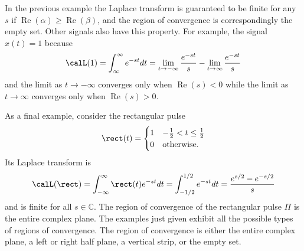 \documentclass[11pt,a4paper]{book}
\theoremstyle{plain}
\numberwithin{equation}{section}
\newcommand{\complex}{{\mathbb C}}
\renewcommand{\Re}{\operatorname{Re}}
\begin{document}
In the previous example the Laplace transform is guaranteed to be finite for any $s$ if $\Re(\alpha) \geq \Re(\beta)$, and the region of convergence is correspondingly the empty set.  Other signals also have this property.  For example, the signal $x(t) = 1$ because
\[
\calL(1) = \int_{\infty}^\infty e^{-s t} dt = \lim_{t\to -\infty} \frac{e^{-st}}{s} -  \lim_{t\to \infty} \frac{e^{-st}}{s}
\] 
and the limit as $t\to-\infty$ converges only when $\Re(s) < 0$ while the limit as $t \to \infty$ converges only when $\Re(s) > 0$.  %

As a final example, consider the rectangular pulse
\[
\rect(t) = \begin{cases}
1 & -\tfrac{1}{2} < t \leq \tfrac{1}{2} \\
0 & \text{otherwise}.
\end{cases}
\]
Its Laplace transform is
\begin{equation}\label{eq:rectLaplace}
\calL(\rect) = \int_{-\infty}^{\infty} \rect(t) e^{-st} dt = \int_{-1/2}^{1/2} e^{-st} dt = \frac{ e^{s/2} - e^{-s/2}}{s}
\end{equation}
and is finite for all $s \in \complex$.  The region of convergence of the rectangular pulse $\Pi$ is the entire complex plane.  The examples just given exhibit all the possible types of regions of convergence.  The region of convergence is either the entire complex plane, a left or right half plane, a vertical strip, or the empty set.
 
\end{document}
